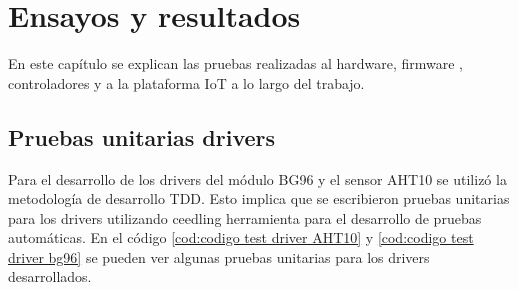 
\chapter{Ensayos y resultados} %
En este capítulo se explican las pruebas realizadas al hardware, firmware , controladores y a la plataforma IoT a lo largo del trabajo.
\label{Chapter4} %


\section{Pruebas unitarias drivers}
Para el desarrollo de los drivers del módulo BG96 y el sensor AHT10 se utilizó la metodología de desarrollo TDD. Esto implica que se escribieron pruebas unitarias para los drivers utilizando ceedling herramienta para el desarrollo de pruebas automáticas. En el código  \ref{cod:codigo test driver AHT10} y \ref{cod:codigo test driver bg96} se pueden ver algunas pruebas unitarias para los drivers desarrollados.
